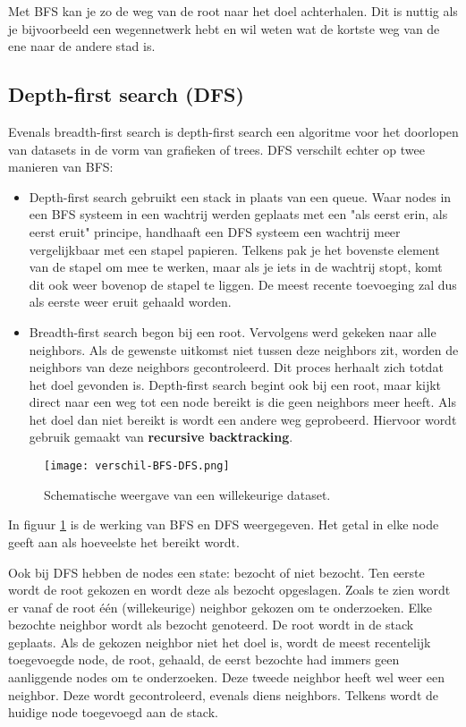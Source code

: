 Met BFS kan je zo de weg van de root naar het doel achterhalen. Dit is nuttig als je bijvoorbeeld een wegennetwerk hebt en wil weten wat de kortste weg van de ene naar de andere stad is.


\subsection{Depth-first search (DFS)}
Evenals breadth-first search is depth-first search een algoritme voor het doorlopen van datasets in de vorm van grafieken of trees. DFS verschilt echter op twee manieren van BFS:

\begin{itemize}
\item Depth-first search gebruikt een stack in plaats van een queue. Waar nodes in een BFS systeem in een wachtrij werden geplaats met een "als eerst erin, als eerst eruit" principe, handhaaft een DFS systeem een wachtrij meer vergelijkbaar met een stapel papieren. Telkens pak je het bovenste element van de stapel om mee te werken, maar als je iets in de wachtrij stopt, komt dit ook weer bovenop de stapel te liggen. De meest recente toevoeging zal dus als eerste weer eruit gehaald worden.
\item Breadth-first search begon bij een root. Vervolgens werd gekeken naar alle neighbors. Als de gewenste uitkomst niet tussen deze neighbors zit, worden de neighbors van deze neighbors gecontroleerd. Dit proces herhaalt zich totdat het doel gevonden is.
Depth-first search begint ook bij een root, maar kijkt direct naar een weg tot een node bereikt is die geen neighbors meer heeft. Als het doel dan niet bereikt is wordt een andere weg geprobeerd. Hiervoor wordt gebruik gemaakt van \textbf{recursive backtracking}.

\end{itemize}

\begin{figure}[H]
  \centering
    \texttt{[image: verschil-BFS-DFS.png]}
  \caption{Schematische weergave van een willekeurige dataset.}
  \label{fig:verschil-BFS-DFS}
\end{figure}

In figuur \ref{fig:verschil-BFS-DFS} is de werking van BFS en DFS weergegeven. Het getal in elke node geeft aan als hoeveelste het bereikt wordt. 

Ook bij DFS hebben de nodes een state: bezocht of niet bezocht.
Ten eerste wordt de root gekozen en wordt deze als bezocht opgeslagen. Zoals te zien wordt er vanaf de root \'e\'en (willekeurige) neighbor gekozen om te onderzoeken. Elke bezochte neighbor wordt als bezocht genoteerd. De root wordt in de stack geplaats. Als de gekozen neighbor niet het doel is, wordt de meest recentelijk toegevoegde node, de root, gehaald, de eerst bezochte had immers geen aanliggende nodes om te onderzoeken. Deze tweede neighbor heeft wel weer een neighbor. Deze wordt gecontroleerd, evenals diens neighbors. Telkens wordt de huidige node toegevoegd aan de stack.

